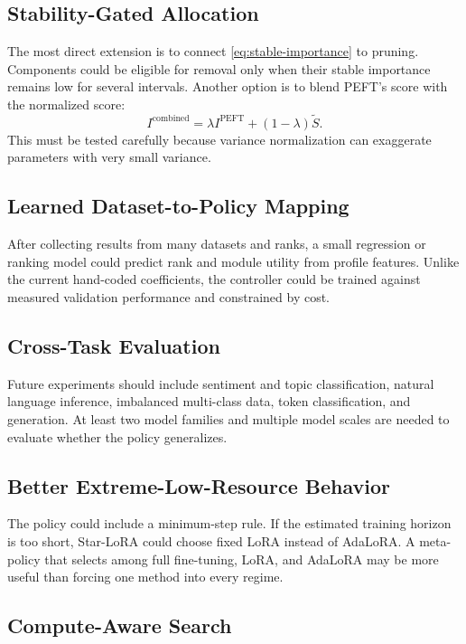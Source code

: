 \subsection{Stability-Gated Allocation}

The most direct extension is to connect \cref{eq:stable-importance} to pruning. Components could be
eligible for removal only when their stable importance remains low for several intervals. Another
option is to blend PEFT's score with the normalized score:
\begin{equation}
  I^{\mathrm{combined}} =
  \lambda I^{\mathrm{PEFT}} +
  (1-\lambda)\widetilde{S}.
\end{equation}
This must be tested carefully because variance normalization can exaggerate parameters with very
small variance.

\subsection{Learned Dataset-to-Policy Mapping}

After collecting results from many datasets and ranks, a small regression or ranking model could
predict rank and module utility from profile features. Unlike the current hand-coded coefficients,
the controller could be trained against measured validation performance and constrained by cost.

\subsection{Cross-Task Evaluation}

Future experiments should include sentiment and topic classification, natural language inference,
imbalanced multi-class data, token classification, and generation. At least two model families and
multiple model scales are needed to evaluate whether the policy generalizes.

\subsection{Better Extreme-Low-Resource Behavior}

The policy could include a minimum-step rule. If the estimated training horizon is too short,
Star-LoRA could choose fixed LoRA instead of AdaLoRA. A meta-policy that selects among full
fine-tuning, LoRA, and AdaLoRA may be more useful than forcing one method into every regime.

\subsection{Compute-Aware Search}

